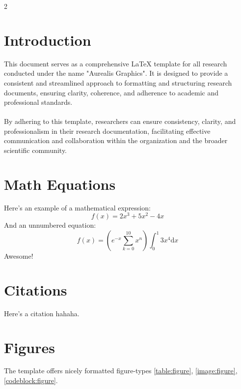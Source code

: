 \documentclass[9pt,a4paper,oneside]{extarticle}
\begin{document}
\begin{multicols*}{2}

\noindent{}

\section{Introduction}
This document serves as a comprehensive LaTeX template for all research conducted under the name "Aurealis Graphics". It is designed to provide a consistent and streamlined approach to formatting and structuring research documents, ensuring clarity, coherence, and adherence to academic and professional standards.\\
\\
By adhering to this template, researchers can ensure consistency, clarity, and professionalism in their research documentation, facilitating effective communication and collaboration within the organization and the broader scientific community.

\section{Math Equations}
Here's an example of a mathematical expression:
\begin{equation}
    f(x)=2x^3+5x^2-4x
\end{equation}
And an unnumbered equation:
\begin{equation*}
    f(x)=\left(e^{-x}\sum_{k=0}^{10} x^n\right)\int_0^1 3x^4\mathrm{d}x
\end{equation*}
Awesome!

\section{Citations}
Here's a citation \cite{Nic77:Nicodemus1977} hahaha.

\section{Figures}
The template offers nicely formatted figure-types \ref{table:figure}, \ref{image:figure}, \ref{codeblock:figure}.


\end{multicols*}
\end{document}
